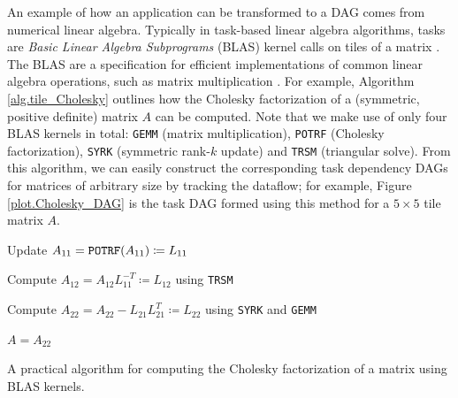 \documentclass[runningheads]{llncs}
\begin{document}
An example of how an application can be transformed to a DAG comes from numerical linear algebra. Typically in task-based linear algebra algorithms, tasks are {\em Basic Linear Algebra Subprograms} (BLAS) kernel calls on tiles of a matrix \cite{tdb10}. The BLAS are a specification for efficient implementations of common linear algebra operations, such as matrix multiplication \cite{dongarra1988extended}. For example, Algorithm \ref{alg.tile_Cholesky} outlines how the Cholesky factorization of a (symmetric, positive definite) matrix $A$ can be computed. Note that we make use of only four BLAS kernels in total: {\tt GEMM} (matrix multiplication), {\tt POTRF} (Cholesky factorization), {\tt SYRK} (symmetric rank-$k$ update) and {\tt TRSM} (triangular solve). From this algorithm, we can easily construct the corresponding task dependency DAGs for matrices of arbitrary size by tracking the dataflow; for example, Figure \ref{plot.Cholesky_DAG} is the task DAG formed using this method for a $5 \times 5$ tile matrix $A$.

\begin{algorithm}	
	
	
	
	
	{
		Update $A_{11} = {\tt POTRF}(A_{11}) \coloneqq L_{11}$
		
		Compute $A_{12} = A_{12}L_{11}^{-T} \coloneqq L_{12}$ using {\tt TRSM}
		
		Compute $A_{22} = A_{22} - L_{21} L_{21}^{T} \coloneqq L_{22}$ using {\tt SYRK} and {\tt GEMM}
		
		$A = A_{22}$
	}		
	
	\caption{A practical algorithm for computing the Cholesky factorization of a matrix using BLAS kernels.}
	\label{alg.tile_Cholesky}
\end{algorithm} 
\end{document}

